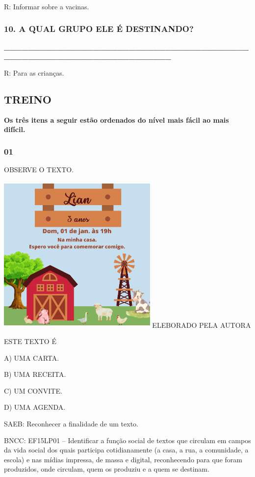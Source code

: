 R: Informar sobre a vacinas.

\subsubsection{10. A QUAL GRUPO ELE É
DESTINANDO?}\label{para-qual-grupo-ele-uxe9-destinando}

\textbf{\_\_\_\_\_\_\_\_\_\_\_\_\_\_\_\_\_\_\_\_\_\_\_\_\_\_\_\_\_\_\_\_\_\_\_\_\_\_\_\_\_\_\_\_\_\_\_\_\_\_\_\_\_\_\_\_\_\_\_\_\_\_\_\_\_\_\_\_\_}

R: Para as crianças.

\subsection{TREINO}\label{treino-3}

\textbf{Os três itens a seguir estão ordenados do nível mais fácil ao mais
difícil. }

\subsubsection{01 }\label{section-12}

OBSERVE O TEXTO.

\includegraphics[width=3.10106in,height=3.10106in]{media/image157.png}
ELEBORADO PELA AUTORA

ESTE TEXTO É

A) UMA CARTA.

B) UMA RECEITA.

C) UM CONVITE.

D) UMA AGENDA.

SAEB: Reconhecer a finalidade de um texto.

BNCC: EF15LP01 -- Identificar a função social de textos que
circulam em campos da vida social dos quais participa cotidianamente (a
casa, a rua, a comunidade, a escola) e nas mídias impressa, de massa e
digital, reconhecendo para que foram produzidos, onde circulam, quem os
produziu e a quem se destinam.

